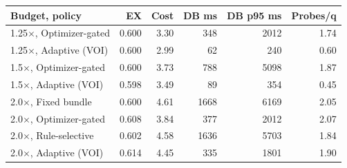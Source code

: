 \begin{tabular}{@{}lrrrrr@{}}
\toprule
Budget, policy & EX & Cost & DB ms & DB p95 ms & Probes/q \\
\midrule
1.25$\times$, Optimizer-gated & 0.600 & 3.30 & 348 & 2012 & 1.74 \\
1.25$\times$, Adaptive (VOI) & 0.600 & 2.99 & 62 & 240 & 0.60 \\
\midrule
1.5$\times$, Optimizer-gated & 0.600 & 3.73 & 788 & 5098 & 1.87 \\
1.5$\times$, Adaptive (VOI) & 0.598 & 3.49 & 89 & 354 & 0.45 \\
\midrule
2.0$\times$, Fixed bundle & 0.600 & 4.61 & 1668 & 6169 & 2.05 \\
2.0$\times$, Optimizer-gated & 0.608 & 3.84 & 377 & 2012 & 2.07 \\
2.0$\times$, Rule-selective & 0.602 & 4.58 & 1636 & 5703 & 1.84 \\
2.0$\times$, Adaptive (VOI) & 0.614 & 4.45 & 335 & 1801 & 1.90 \\
\bottomrule
\end{tabular}